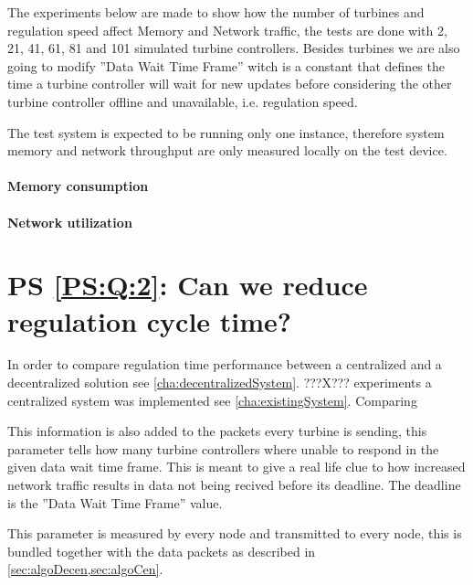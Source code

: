 The experiments below are made to show how the number of turbines and regulation speed affect Memory and Network traffic, the tests are done with 2, 21, 41, 61, 81 and 101 simulated turbine controllers. Besides turbines we are also going to modify ''Data Wait Time Frame'' witch is a constant that defines the time a turbine controller will wait for new updates before considering the other turbine controller offline and unavailable, i.e. regulation speed.

The test system is expected to be running only one instance, therefore system memory and network throughput are only measured locally on the test device.

\paragraph{Memory consumption} 
\paragraph{Network utilization}

\section{PS \ref{PS:Q:2}: Can we reduce regulation cycle time?}
In order to compare regulation time performance between a centralized and a decentralized solution see \cref{cha:decentralizedSystem}. ???X??? experiments a centralized system was implemented see \cref{cha:existingSystem}.
Comparing 

This information is also added to the packets every turbine is sending, this parameter tells how many turbine controllers where unable to respond in the given data wait time frame. This is meant to give a real life clue to how increased network traffic results in data not being recived before its deadline. The deadline is the ''Data Wait Time Frame'' value.

This parameter is measured by every node and transmitted to every node, this is bundled together with the data packets as described in \cref{sec:algoDecen,sec:algoCen}.

